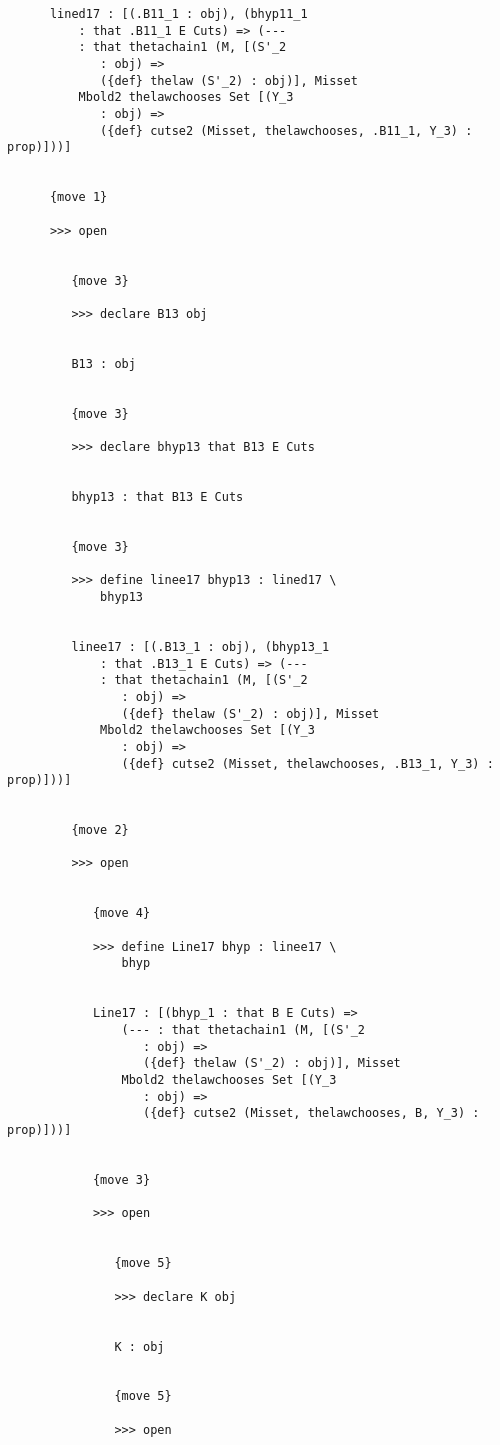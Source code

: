 \documentclass[12pt]{article}
\begin{document}
\begin{verbatim}
      lined17 : [(.B11_1 : obj), (bhyp11_1 
          : that .B11_1 E Cuts) => (--- 
          : that thetachain1 (M, [(S'_2 
             : obj) => 
             ({def} thelaw (S'_2) : obj)], Misset 
          Mbold2 thelawchooses Set [(Y_3 
             : obj) => 
             ({def} cutse2 (Misset, thelawchooses, .B11_1, Y_3) : prop)]))]


      {move 1}

      >>> open


         {move 3}

         >>> declare B13 obj


         B13 : obj


         {move 3}

         >>> declare bhyp13 that B13 E Cuts


         bhyp13 : that B13 E Cuts


         {move 3}

         >>> define linee17 bhyp13 : lined17 \
             bhyp13


         linee17 : [(.B13_1 : obj), (bhyp13_1 
             : that .B13_1 E Cuts) => (--- 
             : that thetachain1 (M, [(S'_2 
                : obj) => 
                ({def} thelaw (S'_2) : obj)], Misset 
             Mbold2 thelawchooses Set [(Y_3 
                : obj) => 
                ({def} cutse2 (Misset, thelawchooses, .B13_1, Y_3) : prop)]))]


         {move 2}

         >>> open


            {move 4}

            >>> define Line17 bhyp : linee17 \
                bhyp


            Line17 : [(bhyp_1 : that B E Cuts) => 
                (--- : that thetachain1 (M, [(S'_2 
                   : obj) => 
                   ({def} thelaw (S'_2) : obj)], Misset 
                Mbold2 thelawchooses Set [(Y_3 
                   : obj) => 
                   ({def} cutse2 (Misset, thelawchooses, B, Y_3) : prop)]))]


            {move 3}

            >>> open


               {move 5}

               >>> declare K obj


               K : obj


               {move 5}

               >>> open



\end{verbatim}
\end{document}
